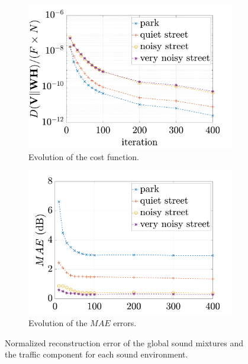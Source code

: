 \documentclass[review,5p,twocolumn,sort&compress,times]{elsarticle}
\begin{document}
\begin{figure}[t]
\centering
\begin{subfigure}{0.45\textwidth}
\includegraphics[width=\linewidth]{./figures/evolutionCost_AA.pdf}
\caption{Evolution of the cost function.} \label{fig:grafic_cost}
\end{subfigure}
\begin{subfigure}{0.45\textwidth}
\includegraphics[width=\linewidth]{./figures/evolutionMAE_AA.pdf}
\caption{Evolution of the $MAE$ errors.} \label{fig:grafic_mae}
\end{subfigure}
\caption{Normalized reconstruction error of the global sound mixtures  and the traffic component  for each sound environment.} \label{fig:grafic_cost_mae}
\end{figure}
\end{document}
